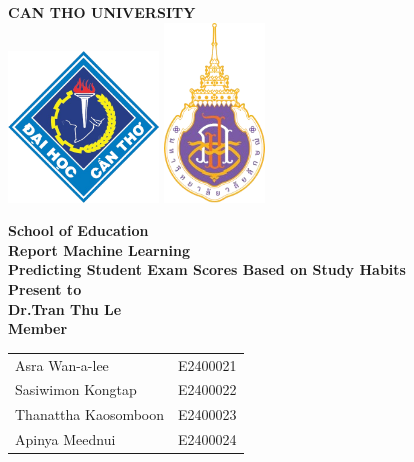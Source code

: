 \documentclass[a4paper,12pt]{article}
\begin{document}
	
	\begin{center}
		{\Huge\textbf{CAN THO UNIVERSITY}}\\[3em]
		\includegraphics[width=0.3\textwidth]{pic1.png} \hspace{1cm} \includegraphics[width=0.2\textwidth]{pic2.png}
	\end{center}
	
	\begin{center}
		\vspace*{2cm}
		{\LARGE\textbf{School of Education}}\\[1.5em]
		{\LARGE\textbf{Report Machine Learning}}\\[3em]
		{\LARGE\textbf{ Predicting Student Exam Scores Based on Study Habits
		}}\\[4em]
		{\LARGE\textbf {Present to}}\\[1em]
		{\large\textbf{Dr.Tran Thu Le}}\\[2em]
		{\LARGE\textbf{Member}}\\[2em]
		
	{\Large
		\begin{tabular}{@{}l@{\quad}r@{}}
			Asra Wan-a-lee       & E2400021 \\
			Sasiwimon Kongtap    & E2400022 \\
			Thanattha Kaosomboon & E2400023 \\
			Apinya Meednui       & E2400024
		\end{tabular}
	}\\[3em]
		
	\end{center}
	
\end{document}
